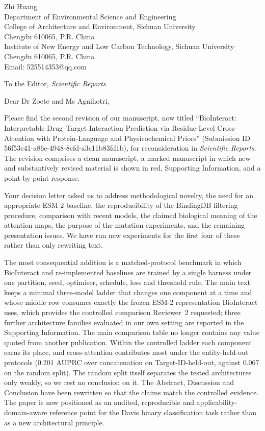 \documentclass[11pt]{article}
\begin{document}
\begin{flushright}
Zhi Huang\\
Department of Environmental Science and Engineering\\
College of Architecture and Environment, Sichuan University\\
Chengdu 610065, P.R. China\\
Institute of New Energy and Low Carbon Technology, Sichuan University\\
Chengdu 610065, P.R. China\\
Email: 525514353@qq.com
\end{flushright}

\vspace{1em}
\noindent To the Editor, \textit{Scientific Reports}

\vspace{1em}
\noindent Dear Dr Zoete and Ms Agnihotri,

Please find the second revision of our manuscript, now titled ``BioInteract:
Interpretable Drug--Target Interaction Prediction via Residue-Level
Cross-Attention with Protein-Language and Physicochemical Priors'' (Submission ID
56f53c41-a86e-4948-8cfd-a3c11b83fd1b), for reconsideration in
\textit{Scientific Reports}.  The revision comprises a clean manuscript, a
marked manuscript in which new and substantively revised material is shown in
red, Supporting Information, and a point-by-point response.

Your decision letter asked us to address methodological novelty, the need for an
appropriate ESM-2 baseline, the reproducibility of the BindingDB filtering
procedure, comparison with recent models, the claimed biological meaning of the
attention maps, the purpose of the mutation experiments, and the remaining
presentation issues.  We have run new experiments for the first four of these
rather than only rewriting text.

The most consequential addition is a matched-protocol benchmark in which
BioInteract and re-implemented baselines are trained by a single harness under
one partition, seed, optimiser, schedule, loss and threshold rule.  The main
text keeps a minimal three-model ladder that changes one component at a time and
whose middle row consumes exactly the frozen ESM-2 representation BioInteract
uses, which provides the controlled comparison Reviewer~2 requested; three
further architecture families evaluated in our own setting are reported in the
Supporting Information.  The main comparison table no longer contains any value
quoted from another publication.  Within the controlled ladder each component earns its
place, and cross-attention contributes most under the entity-held-out protocols
(0.201 AUPRC over concatenation on Target-ID-held-out, against 0.067 on the
random split).  The random split itself separates the tested architectures only
weakly, so we rest no conclusion on it.  The Abstract, Discussion and Conclusion
have been rewritten so that the claims match the controlled evidence.  The paper is now positioned as an
audited, reproducible and applicability-domain-aware reference point for the
Davis binary classification task rather than as a new architectural principle.
\end{document}
